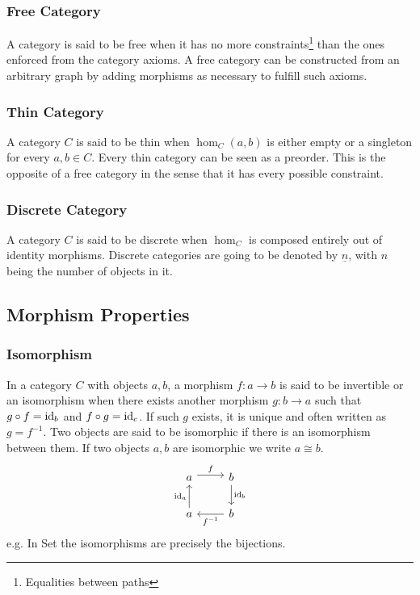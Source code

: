 \subsubsection*{Free Category}
A category is said to be free when it has no more
constraints\footnote{Equalities between paths} than the ones enforced from the
category axioms. \parencite{adamek_herrlich_strecker:joy_cats} A free category
can be constructed from an arbitrary graph by adding morphisms as necessary to
fulfill such axioms.

\subsubsection*{Thin Category}
A category $C$ is said to be thin when $\hom_C(a, b)$ is either empty or
a singleton for every $a,b\in C$. \parencite{adamek_herrlich_strecker:joy_cats}
Every thin category can be seen as a preorder. This is the opposite of a free
category in the sense that it has every possible constraint.

\subsubsection*{Discrete Category}
A category $C$ is said to be discrete when $\hom_C$ is composed entirely
out of identity morphisms. \parencite{awodey:category_theory} Discrete
categories are going to be denoted by $\underline{n}$, with $n$ being the number
of objects in it.

\subsection{Morphism Properties}

\subsubsection*{Isomorphism}
In a category $C$ with objects $a, b$, a morphism $f: a\to b$ is said to be
invertible or an isomorphism when there exists another morphism $g:b \to a$ such
that $g\circ f = \mathrm{id}_b$ and $f\circ g = \mathrm{id}_c$.
\parencite{maclane:working_mathematician}
If such $g$ exists, it is unique and often written as $g= f^{-1}$. Two objects
are said to be isomorphic if there is an isomorphism between them. If two
objects $a,b$ are isomorphic we write $a\cong b$.
\[\begin{tikzcd}
	a & b \\
	a & b
	\arrow["f", shift left=1, from=1-1, to=1-2]
	\arrow["{f^{-1}}", from=2-2, to=2-1]
	\arrow["{\id_a}", from=2-1, to=1-1]
	\arrow["{\id_b}", from=1-2, to=2-2]
\end{tikzcd}\]
e.g. In Set the isomorphisms are precisely the bijections.

